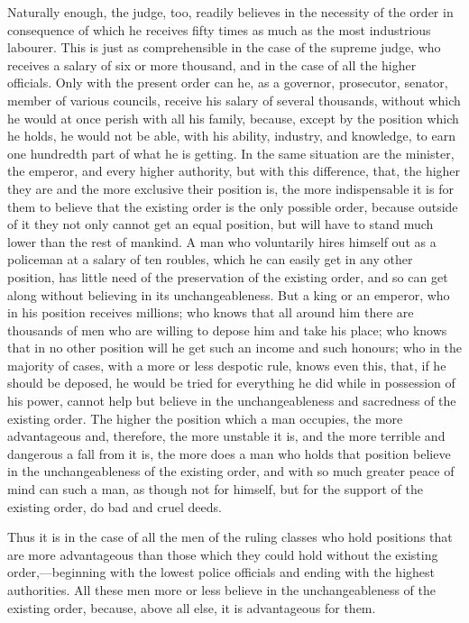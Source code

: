 \documentclass{book}
\begin{document}
Naturally enough, the judge, too, readily believes in the necessity of the order in consequence of which he receives fifty times as much as the most industrious labourer. This is just as comprehensible in the case of the supreme judge, who receives a salary of six or more thousand, and in the case of all the higher officials. Only with the present order can he, as a governor, prosecutor, senator, member of various councils, receive his salary of several thousands, without which he would at once perish with all his family, because, except by the position which he holds, he would not be able, with his ability, industry, and knowledge, to earn one hundredth part of what he is getting. In the same situation are the minister, the emperor, and every higher authority, but with this difference, that, the higher they are and the more exclusive their position is, the more indispensable it is for them to believe that the existing order is the only possible order, because outside of it they not only cannot get an equal position, but will have to stand much lower than the rest of mankind. A man who voluntarily hires himself out as a policeman at a salary of ten roubles, which he can easily get in any other position, has little need of the preservation of the existing order, and so can get along without believing in its unchangeableness. But a king or an emperor, who in his position receives millions; who knows that all around him there are thousands of men who are willing to depose him and take his place; who knows that in no other position will he get such an income and such honours; who in the majority of cases, with a more or less despotic rule, knows even this, that, if he should be deposed, he would be tried for everything he did while in possession of his power, cannot help but believe in the unchangeableness and sacredness of the existing order. The higher the position which a man occupies, the more advantageous and, therefore, the more unstable it is, and the more terrible and dangerous a fall from it is, the more does a man who holds that position believe in the unchangeableness of the existing order, and with so much greater peace of mind can such a man, as though not for himself, but for the support of the existing order, do bad and cruel deeds.

Thus it is in the case of all the men of the ruling classes who hold positions that are more advantageous than those which they could hold without the existing order,—beginning with the lowest police officials and ending with the highest authorities. All these men more or less believe in the unchangeableness of the existing order, because, above all else, it is advantageous for them.
\end{document}
